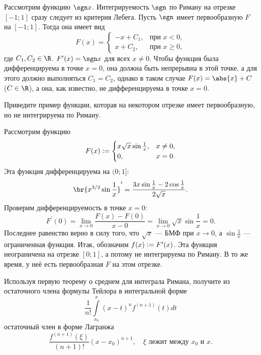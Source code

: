 \begin{solution}
    Рассмотрим функцию $\sgn x$. Интегрируемость $\sgn$ по Риману на отрезке $[-1; 1]$ сразу следует из критерия Лебега. Пусть $\sgn$ имеет первообразную $F$ на $[-1; 1]$. Тогда она имеет вид
    \[
        F(x) =
        \begin{cases}
            -x + C_1,&\text{при $x < 0$},\\
            x + C_2,&\text{при $x \geqslant 0$},
        \end{cases}
    \]
    где $C_1, C_2 \in \R$. $F^\prime(x) = \sgn x$ для всех $x \ne 0$. Чтобы функция была дифференцируема в точке $x = 0$, она должна быть непрерывна в этой точке, а для этого должно выполняться $C_1 = C_2$, однако в таком случае $F(x) = \abs{x} + C$ ($C \in \R$), а она, как известно, не дифференцируема в точке $x = 0$.
\end{solution}

\begin{problem}[13$^\circ$]
    Приведите пример функции, которая на некотором отрезке имеет первообразную, но не интегрируема по Риману.
\end{problem}

\begin{solution}
    Рассмотрим функцию 
    \[
        F(x) \vcentcolon = 
        \begin{cases}
            x\sqrt{x}\sin\frac{1}{x},& x \ne 0,\\
            0,& x = 0.
        \end{cases}
    \]
    Эта функция дифференцируема на $(0; 1]$:
    \[
        \br{x^{3 / 2}\sin\frac{1}{x}}^\prime = \frac{3x\sin\frac{1}{x} - 2\cos\frac{1}{x}}{2\sqrt{x}}.
    \]
    Проверим дифференцируемость в точке $x = 0$:
    \[
        F^\prime(0) = \lim_{x \to 0}\frac{F(x) - F(0)}{x - 0} = \lim_{x \to 0}\sqrt{x}\sin\frac{1}{x} = 0.
    \]
    Последнее равенство верно в силу того, что $\sqrt{x}$ --- БМФ при $x \to 0$, а $\sin\frac{1}{x}$ --- ограниченная функция. Итак, обозначим $f(x) \vcentcolon = F^\prime(x)$. Эта функция неограничена на отрезке $[0; 1]$, а потому не интегрируема по Риману. В то же время, у неё есть первообразная $F$ на этом отрезке.
\end{solution}

\begin{problem}[15$^\circ$]
    Используя первую теорему о среднем для интеграла Римана, получите из остаточного члена формулы Тейлора в интегральной форме
    \[
        \frac{1}{n!}\int\limits_{x_0}^x(x - t)^nf^{(n + 1)}(t)dt
    \]
    остаточный член в форме Лагранжа
    \[
        \frac{f^{(n + 1)}(\xi)}{(n + 1)!}(x - x_0)^{n + 1},\quad\text{$\xi$ лежит между $x_0$ и $x$}.
    \]
\end{problem}

